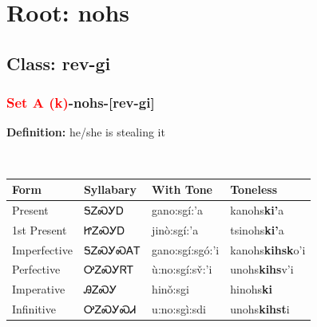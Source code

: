 \needspace{4in}
\section*{Root: nohs}
\nopagebreak
{}
\needspace{3in}
\subsection*{Class: rev-gi}
\nopagebreak
\needspace{2in}
\subsubsection*{\textcolor{Red}{Set A (k)}{-}\textbf{nohs}{-}[rev-gi]}
\nopagebreak
\textbf{Definition: } he/she is stealing it
\\[0.5em]
\begin{tabularx}{\textwidth}{l X X X}%
\toprule%
\textbf{Form}&\textbf{Syllabary}&\textbf{With Tone}&\textbf{Toneless}\\%
\midrule%
Present&ᎦᏃᏍᎩᎠ&gano:sgí:’a&kanohs\textbf{ki'}a\\%
1st Present&ᏥᏃᏍᎩᎠ&jinò:sgí:’a&tsinohs\textbf{ki'}a\\%
Imperfective&ᎦᏃᏍᎩᏍᎪᎢ&gano:sgí:sgó:’i&kanohs\textbf{kihsk}o'i\\%
Perfective&ᎤᏃᏍᎩᏒᎢ&ù:no:sgí:sv̌:’i&unohs\textbf{kihs}v'i\\%
Imperative&ᎯᏃᏍᎩ&hinǒ:sgi&hinohs\textbf{ki}\\%
Infinitive&ᎤᏃᏍᎩᏍᏗ&u:no:sgì:sdi&unohs\textbf{kihst}i\\%
\bottomrule%
\end{tabularx}
\\[1em]